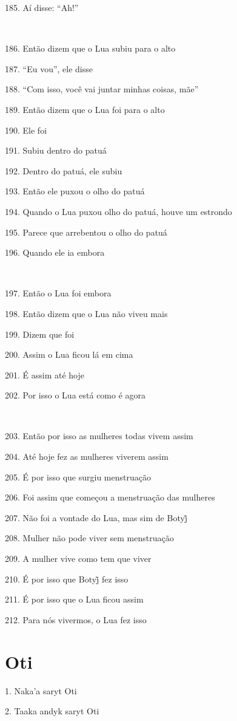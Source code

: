185. Aí disse: ``Ah!''

~

186. Então dizem que o Lua subiu para o alto

187. ``Eu vou'', ele disse

188. ``Com isso, você vai juntar minhas coisas, mãe''

189. Então dizem que o Lua foi para o alto

190. Ele foi

191. Subiu dentro do patuá

192. Dentro do patuá, ele subiu

193. Então ele puxou o olho do patuá

194. Quando o Lua puxou olho do patuá, houve um estrondo

195. Parece que arrebentou o olho do patuá

196. Quando ele ia embora

~

197. Então o Lua foi embora

198. Então dizem que o Lua não viveu mais

199. Dizem que foi

200. Assim o Lua ficou lá em cima

201. É assim até hoje

202. Por isso o Lua está como é agora

~

203. Então por isso as mulheres todas vivem assim

204. Até hoje fez as mulheres viverem assim

205. É por isso que surgiu menstruação

206. Foi assim que começou a menstruação das mulheres

207. Não foi a vontade do Lua, mas sim de Botyj̃

208. Mulher não pode viver sem menstruação

209. A mulher vive como tem que viver

210. É por isso que Botyj̃ fez isso

211. É por isso que o Lua ficou assim

212. Para nós vivermos, o Lua fez isso

\chapter*{Oti}

1. Naka'a saryt Oti

2. Taaka andyk saryt Oti

